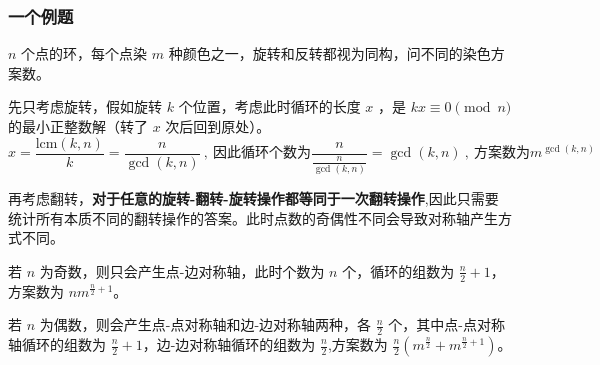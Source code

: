     \subsubsection*{一个例题}

	$n$ 个点的环，每个点染 $m$ 种颜色之一，旋转和反转都视为同构，问不同的染色方案数。

    先只考虑旋转，假如旋转 $k$ 个位置，考虑此时循环的长度 $x$ ，是 $kx\equiv 0\pmod{n}$ 的最小正整数解（转了 $x$ 次后回到原处）。
    $$
    x=\frac{\text{lcm}(k,n)}{k}=\frac{n}{\gcd(k,n)}\ ,\ \text{因此循环个数为}\frac{n}{\frac{n}{\gcd(k,n)}}=\gcd(k,n)\ ,\ \text{方案数为} m^{\gcd(k,n)}
    $$

    再考虑翻转，\textbf{对于任意的旋转-翻转-旋转操作都等同于一次翻转操作},因此只需要统计所有本质不同的翻转操作的答案。此时点数的奇偶性不同会导致对称轴产生方式不同。

    若 $n$ 为奇数，则只会产生点-边对称轴，此时个数为 $n$ 个，循环的组数为 $\frac{n}2+1$，方案数为 $nm^{\frac{n}{2}+1}$。

    若 $n$ 为偶数，则会产生点-点对称轴和边-边对称轴两种，各 $\frac{n}2$ 个，其中点-点对称轴循环的组数为 $\frac{n}2+1$，边-边对称轴循环的组数为 $\frac{n}2$,方案数为 $\frac n2(m^{\frac n2}+m^{\frac n2+1})​$。
